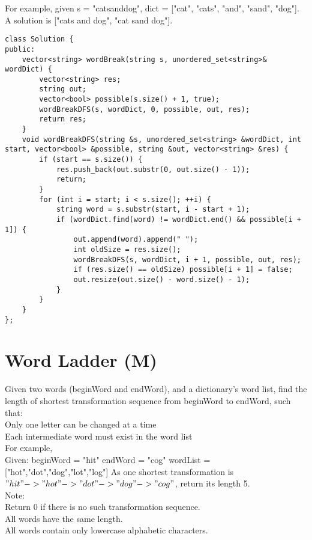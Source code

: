For example, given
s = "catsanddog",
dict = ["cat", "cats", "and", "sand", "dog"].
A solution is ["cats and dog", "cat sand dog"]. \\

\begin{lstlisting}
class Solution {
public:
    vector<string> wordBreak(string s, unordered_set<string>& wordDict) {
        vector<string> res;
        string out;
        vector<bool> possible(s.size() + 1, true);
        wordBreakDFS(s, wordDict, 0, possible, out, res);
        return res;
    }
    void wordBreakDFS(string &s, unordered_set<string> &wordDict, int start, vector<bool> &possible, string &out, vector<string> &res) {
        if (start == s.size()) {
            res.push_back(out.substr(0, out.size() - 1));
            return;
        }
        for (int i = start; i < s.size(); ++i) {
            string word = s.substr(start, i - start + 1);
            if (wordDict.find(word) != wordDict.end() && possible[i + 1]) {
                out.append(word).append(" ");
                int oldSize = res.size();
                wordBreakDFS(s, wordDict, i + 1, possible, out, res);
                if (res.size() == oldSize) possible[i + 1] = false;
                out.resize(out.size() - word.size() - 1);
            }
        }
    }
};
\end{lstlisting}


\section{Word Ladder (M)}
Given two words (beginWord and endWord), and a dictionary's word list, find the length of shortest transformation sequence from beginWord to endWord, such that:\\
    Only one letter can be changed at a time\\
    Each intermediate word must exist in the word list\\

For example,\\
Given:
beginWord = "hit"
endWord = "cog"
wordList = ["hot","dot","dog","lot","log"]
As one shortest transformation is $"hit" -> "hot" -> "dot" -> "dog" -> "cog"$,
return its length 5.\\

Note:\\
    Return 0 if there is no such transformation sequence.\\
    All words have the same length.\\
    All words contain only lowercase alphabetic characters.\

